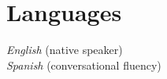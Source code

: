 \documentclass[10pt, a4paper]{article}
\begin{document}
{{%
\section*{Languages}
\textit{English} (native speaker)\\
\textit{Spanish} (conversational fluency)


}}
\end{document}
